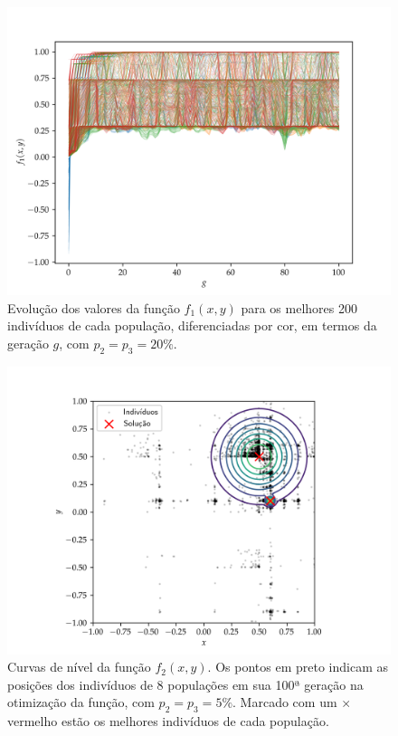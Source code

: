 \begin{figure}[p]
    \centering
    \includegraphics[width=\textwidth]{imagens/high_prob/evolution_damped_cossine.png}
    \caption{
        Evolução dos valores da função $ f_1(x,y) $ para os
        melhores 200 indivíduos de cada população, diferenciadas por cor, em termos da geração $g$,
        com $ p_2 = p_3 = 20\% $.
    }
    \label{fig:evolution_damped_cossine_mut_20}
\end{figure}

\begin{figure}[p]
    \centering
    \includegraphics[width=\textwidth]{imagens/low_prob/contour_near_gaussians.png}
    \caption{
        Curvas de nível da função $f_2(x,y)$. Os pontos em preto indicam as posições dos indivíduos
        de 8 populações em sua 100ª geração na otimização da função, com $ p_2 = p_3 = 5\% $. 
        Marcado com um $\times$ vermelho estão os melhores indivíduos de cada população.
    }
    \label{fig:contour_near_gaussians}
\end{figure}

